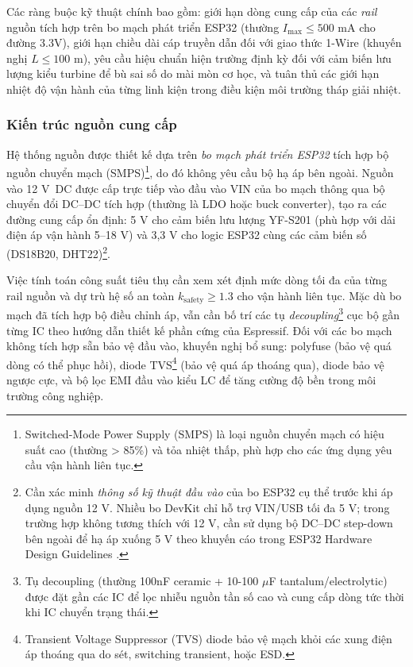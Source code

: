 \documentclass[../main.tex]{subfiles}
\begin{document}
Các ràng buộc kỹ thuật chính bao gồm: giới hạn dòng cung cấp của các \textit{rail} nguồn tích hợp trên bo mạch phát triển ESP32 (thường $I_{\text{max}} \leq 500$ mA cho đường 3.3V), giới hạn chiều dài cáp truyền dẫn đối với giao thức 1-Wire (khuyến nghị $L \leq 100$ m), yêu cầu hiệu chuẩn hiện trường định kỳ đối với cảm biến lưu lượng kiểu turbine để bù sai số do mài mòn cơ học, và tuân thủ các giới hạn nhiệt độ vận hành của từng linh kiện trong điều kiện môi trường tháp giải nhiệt.

\subsubsection{Kiến trúc nguồn cung cấp}
Hệ thống nguồn được thiết kế dựa trên \textit{bo mạch phát triển ESP32} tích hợp bộ nguồn chuyển mạch (SMPS)\footnote{Switched-Mode Power Supply (SMPS) là loại nguồn chuyển mạch có hiệu suất cao (thường > 85\%) và tỏa nhiệt thấp, phù hợp cho các ứng dụng yêu cầu vận hành liên tục.}, do đó không yêu cầu bộ hạ áp bên ngoài. Nguồn vào 12 V~DC được cấp trực tiếp vào đầu vào VIN của bo mạch thông qua bộ chuyển đổi DC--DC tích hợp (thường là LDO hoặc buck converter), tạo ra các đường cung cấp ổn định: 5 V cho cảm biến lưu lượng YF-S201 (phù hợp với dải điện áp vận hành 5--18 V) và 3,3 V cho logic ESP32 cùng các cảm biến số (DS18B20, DHT22)\footnote{Cần xác minh \emph{thông số kỹ thuật đầu vào} của bo ESP32 cụ thể trước khi áp dụng nguồn 12 V. Nhiều bo DevKit chỉ hỗ trợ VIN/USB tối đa 5 V; trong trường hợp không tương thích với 12 V, cần sử dụng bộ DC--DC step-down bên ngoài để hạ áp xuống 5 V theo khuyến cáo trong ESP32 Hardware Design Guidelines \cite{Espressif_ESP32_technical_reference}.}. 

Việc tính toán công suất tiêu thụ cần xem xét định mức dòng tối đa của từng rail nguồn và dự trù hệ số an toàn \(k_{\text{safety}} \geq 1.3\) cho vận hành liên tục. Mặc dù bo mạch đã tích hợp bộ điều chỉnh áp, vẫn cần bố trí các tụ \emph{decoupling}\footnote{Tụ decoupling (thường 100nF ceramic + 10-100 $\mu$F tantalum/electrolytic) được đặt gần các IC để lọc nhiễu nguồn tần số cao và cung cấp dòng tức thời khi IC chuyển trạng thái.} cục bộ gần từng IC theo hướng dẫn thiết kế phần cứng của Espressif. Đối với các bo mạch không tích hợp sẵn bảo vệ đầu vào, khuyến nghị bổ sung: polyfuse (bảo vệ quá dòng có thể phục hồi), diode TVS\footnote{Transient Voltage Suppressor (TVS) diode bảo vệ mạch khỏi các xung điện áp thoáng qua do sét, switching transient, hoặc ESD.} (bảo vệ quá áp thoáng qua), diode bảo vệ ngược cực, và bộ lọc EMI đầu vào kiểu LC để tăng cường độ bền trong môi trường công nghiệp.
\end{document}
